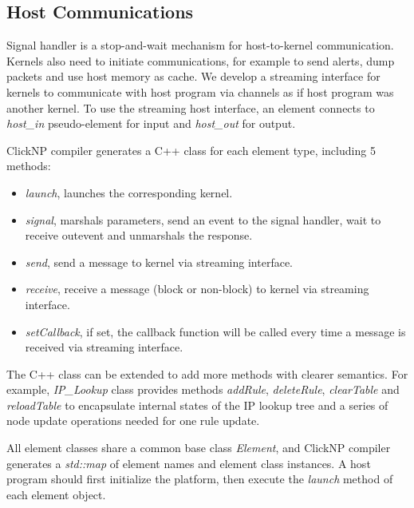 \subsection{Host Communications}

Signal handler is a stop-and-wait mechanism for host-to-kernel communication. Kernels also need to initiate communications, for example to send alerts, dump packets and use host memory as cache. We develop a streaming interface for kernels to communicate with host program via channels as if host program was another kernel. To use the streaming host interface, an element connects to \textit{host\_in} pseudo-element for input and \textit{host\_out} for output.

ClickNP compiler generates a C++ class for each element type, including 5 methods:
\begin{itemize}
	\item \textit{launch}, launches the corresponding kernel.
	\item \textit{signal}, marshals parameters, send an event to the signal handler, wait to receive outevent and unmarshals the response.
	\item \textit{send}, send a message to kernel via streaming interface.
	\item \textit{receive}, receive a message (block or non-block) to kernel via streaming interface.
	\item \textit{setCallback}, if set, the callback function will be called every time a message is received via streaming interface.
\end{itemize}

The C++ class can be extended to add more methods with clearer semantics. For example, \textit{IP\_Lookup} class provides methods \textit{addRule}, \textit{deleteRule}, \textit{clearTable} and \textit{reloadTable} to encapsulate internal states of the IP lookup tree and a series of node update operations needed for one rule update.

All element classes share a common base class \textit{Element}, and ClickNP compiler generates a \textit{std::map} of element names and element class instances. A host program should first initialize the platform, then execute the \textit{launch} method of each element object.
